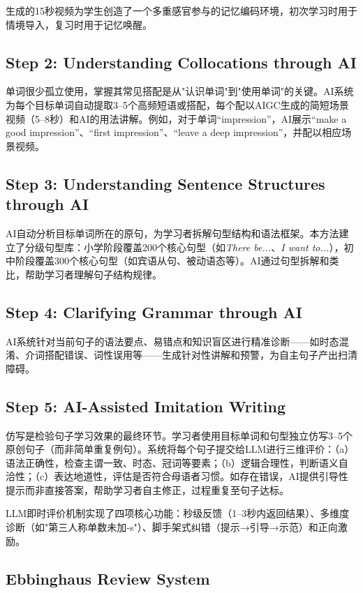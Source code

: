 \documentclass[12pt,a4paper]{ctexart}
\begin{document}
生成的15秒视频为学生创造了一个多重感官参与的记忆编码环境，初次学习时用于情境导入，复习时用于记忆唤醒。

\subsection{Step 2: Understanding Collocations through AI}
单词很少孤立使用，掌握其常见搭配是从"认识单词"到"使用单词"的关键。AI系统为每个目标单词自动提取3--5个高频短语或搭配，每个配以AIGC生成的简短场景视频（5--8秒）和AI的用法讲解。例如，对于单词``impression''，AI展示``make a good impression''、``first impression''、``leave a deep impression''，并配以相应场景视频。

\subsection{Step 3: Understanding Sentence Structures through AI}
AI自动分析目标单词所在的原句，为学习者拆解句型结构和语法框架。本方法建立了分级句型库：小学阶段覆盖200个核心句型（如\textit{There be...}、\textit{I want to...}），初中阶段覆盖300个核心句型（如宾语从句、被动语态等）。AI通过句型拆解和类比，帮助学习者理解句子结构规律。

\subsection{Step 4: Clarifying Grammar through AI}
AI系统针对当前句子的语法要点、易错点和知识盲区进行精准诊断——如时态混淆、介词搭配错误、词性误用等——生成针对性讲解和预警，为自主句子产出扫清障碍。

\subsection{Step 5: AI-Assisted Imitation Writing}
仿写是检验句子学习效果的最终环节。学习者使用目标单词和句型独立仿写3--5个原创句子（而非简单重复例句）。系统将每个句子提交给LLM进行三维评价：（a）语法正确性，检查主谓一致、时态、冠词等要素；（b）逻辑合理性，判断语义自洽性；（c）表达地道性，评估是否符合母语者习惯。如存在错误，AI提供引导性提示而非直接答案，帮助学习者自主修正，过程重复至句子达标。

LLM即时评价机制实现了四项核心功能：秒级反馈（1--3秒内返回结果）、多维度诊断（如"第三人称单数未加-s"）、脚手架式纠错（提示→引导→示范）和正向激励。

\subsection{Ebbinghaus Review System}
\end{document}
